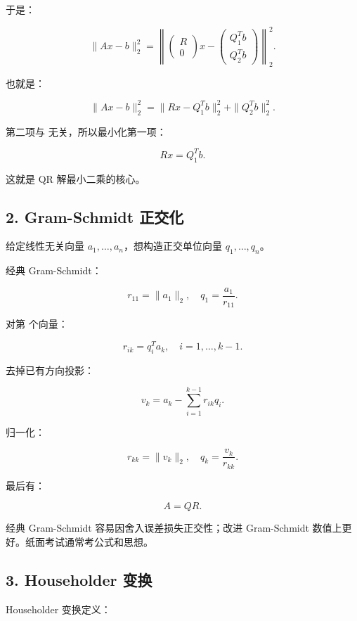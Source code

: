 \documentclass[11pt,a4paper]{ctexart}
\newcommand{\code}[1]{\begingroup\ttfamily\small #1\endgroup}
\begin{document}
于是：

\[
\|Ax-b\|_2^2
=\left\|\begin{pmatrix}R\\0\end{pmatrix}x-
\begin{pmatrix}Q_1^Tb\\Q_2^Tb\end{pmatrix}\right\|_2^2.
\]

也就是：

\[
\|Ax-b\|_2^2
=\|Rx-Q_1^Tb\|_2^2+\|Q_2^Tb\|_2^2.
\]

第二项与 \code{} 无关，所以最小化第一项：

\[
Rx=Q_1^Tb.
\]

这就是 QR 解最小二乘的核心。


\subsection*{2. Gram-Schmidt 正交化}


给定线性无关向量 $a_1,\ldots,a_n$，想构造正交单位向量 $q_1,\ldots,q_n$。

经典 Gram-Schmidt：

\[
r_{11}=\|a_1\|_2,\quad q_1=\frac{a_1}{r_{11}}.
\]

对第 \code{} 个向量：

\[
r_{ik}=q_i^Ta_k,\quad i=1,\ldots,k-1.
\]

去掉已有方向投影：

\[
v_k=a_k-\sum_{i=1}^{k-1}r_{ik}q_i.
\]

归一化：

\[
r_{kk}=\|v_k\|_2,\quad q_k=\frac{v_k}{r_{kk}}.
\]

最后有：

\[
A=QR.
\]

经典 Gram-Schmidt 容易因舍入误差损失正交性；改进 Gram-Schmidt 数值上更好。纸面考试通常考公式和思想。


\subsection*{3. Householder 变换}


Householder 变换定义：
\end{document}
